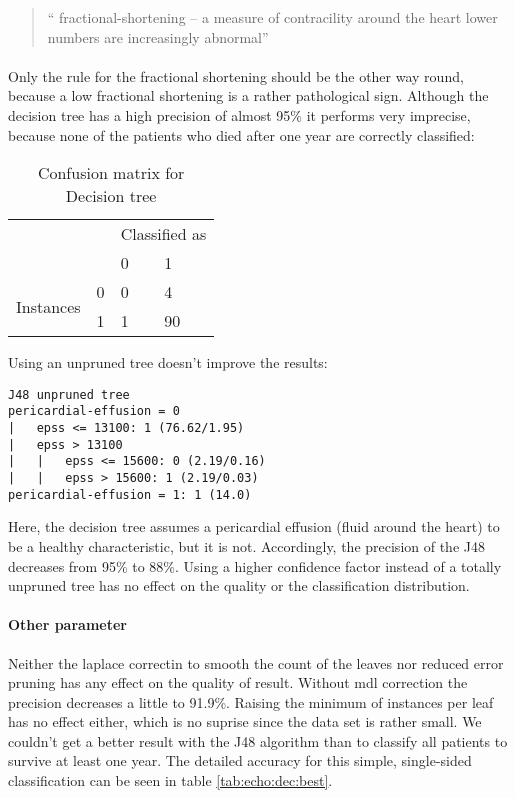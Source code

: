 \documentclass[paper=a4, fontsize=11pt]{scrartcl} %
\numberwithin{equation}{section} %
\numberwithin{figure}{section} %
\numberwithin{table}{section} %
\begin{document}
\begin{quote}
`` fractional-shortening -- a measure of contracility around the heart lower numbers are increasingly abnormal''
\end{quote}

\paragraph{}Only the rule for the fractional shortening should be the other way round, because a low fractional shortening is a rather pathological sign. Although the decision tree has a high precision of almost 95\% it performs very imprecise, because none of the patients who died after one year are correctly classified:

\begin{table*}[htb]\centering
    \begin{tabular}{@{}ll|ll@{}} 
\multicolumn{2}{c}{\phantom{bla}}  & \multicolumn{2}{c}{Classified as} \\  
                        & \phantom{aa}  &  0  &  1  \\ \cmidrule{2-4}
\multirow{2}{*}{Instances}     &  0  &  0  &  4  \\
                                   &  1  &  1  &  90 \\ 
\end{tabular}
\caption{Confusion matrix for Decision tree}
\end{table*}

Using an unpruned tree doesn't improve the results:
\begin{lstlisting}
J48 unpruned tree
pericardial-effusion = 0
|   epss <= 13100: 1 (76.62/1.95)
|   epss > 13100
|   |   epss <= 15600: 0 (2.19/0.16)
|   |   epss > 15600: 1 (2.19/0.03)
pericardial-effusion = 1: 1 (14.0)
\end{lstlisting}
Here, the decision tree assumes a pericardial effusion (fluid around the heart) to be a healthy characteristic, but it is not. Accordingly, the precision of the J48 decreases from 95\% to 88\%. Using a higher confidence factor instead of a totally unpruned tree has no effect on the quality or the classification distribution. 

\paragraph{Other parameter}
Neither the laplace correctin to smooth the count of the leaves nor reduced error pruning has any effect on the quality of result. Without mdl correction the precision decreases a little to 91.9\%. Raising the minimum of instances per leaf has no effect either, which is no suprise since the data set is rather small. We couldn't get a better result with the J48 algorithm than to classify all patients to survive at least one year. The detailed accuracy for this simple, single-sided classification can be seen in table
\ref{tab:echo:dec:best}.  
\end{document}
